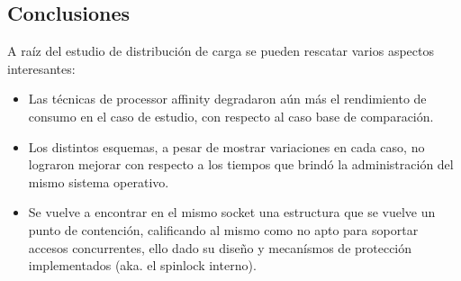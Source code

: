 \subsection{Conclusiones}
A raíz del estudio de distribución de carga se pueden rescatar varios aspectos interesantes:
\begin{itemize}
\item Las técnicas de processor affinity degradaron aún más el rendimiento de consumo en el caso de estudio, con respecto al caso base de comparación.
\item Los distintos esquemas, a pesar de mostrar variaciones en cada caso, no lograron mejorar con respecto a los tiempos que brindó la administración del mismo sistema operativo.
\item Se vuelve a encontrar en el mismo socket una estructura que se vuelve un punto de contención, calificando al mismo como no apto para soportar accesos concurrentes, ello dado su diseño y mecanísmos de protección implementados (aka. el spinlock interno).
\end{itemize}


